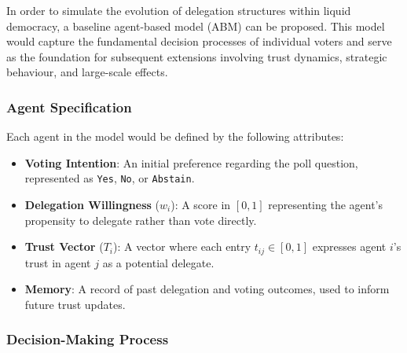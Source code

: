 In order to simulate the evolution of delegation structures within liquid democracy, a baseline agent-based model (ABM) can be proposed. This model would capture the fundamental decision processes of individual voters and serve as the foundation for subsequent extensions involving trust dynamics, strategic behaviour, and large-scale effects.

\subsubsection{Agent Specification}

Each agent in the model would be defined by the following attributes:
\begin{itemize}
\item \textbf{Voting Intention}: An initial preference regarding the poll question, represented as \texttt{Yes}, \texttt{No}, or \texttt{Abstain}.
\item \textbf{Delegation Willingness} ($w_i$): A score in $[0,1]$ representing the agent's propensity to delegate rather than vote directly.
\item \textbf{Trust Vector} ($T_i$): A vector where each entry $t_{ij} \in [0,1]$ expresses agent $i$'s trust in agent $j$ as a potential delegate.
\item \textbf{Memory}: A record of past delegation and voting outcomes, used to inform future trust updates.
\end{itemize}

\subsubsection{Decision-Making Process}

